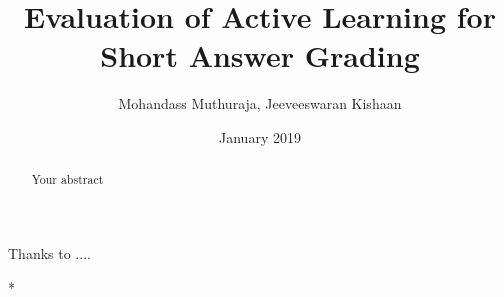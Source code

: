 \documentclass[rnd]{mas_report}
\author{Mohandass Muthuraja, Jeeveeswaran Kishaan}
\title{Evaluation of Active Learning for
Short Answer Grading}
\date{January 2019}
\begin{document}
\begin{titlepage}
    \maketitle
\end{titlepage}


\pagestyle{plain}


\cleardoublepage
\statementpage

\begin{abstract}
Your abstract
\end{abstract}


\begin{acknowledgements}
Thanks to ....
\end{acknowledgements}


\tableofcontents
\listoffigures
\listoftables


\mainmatter %

\pagestyle{mainmatter}






%
*
%




\begin{appendices}


\end{appendices}

\backmatter

\end{document}
